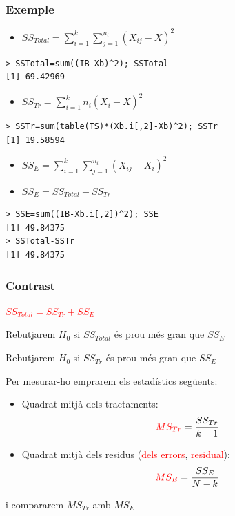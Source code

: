 \documentclass[12pt,t]{beamer}
\newcommand{\red}[1]{\textcolor{red}{#1}}
\renewcommand{\emph}[1]{{\color{red}#1}}
\theoremstyle{plain}
\theoremstyle{definition}
\begin{document}
\begin{frame}[fragile]
\frametitle{Exemple}\vspace*{-3ex}


\begin{itemize}
\item $SS_{Total}=\sum\limits_{i=1}^k\sum\limits_{j=1}^{n_i} (X_{ij}-\overline{X})^2$
\end{itemize}

\begin{lstlisting}
> SSTotal=sum((IB-Xb)^2); SSTotal
[1] 69.42969
\end{lstlisting}\pause

\begin{itemize}
\item $SS_{Tr}=\sum\limits_{i=1}^k n_i
(\overline{X}_{i}-\overline{X})^2$
\end{itemize}

\begin{lstlisting}
> SSTr=sum(table(TS)*(Xb.i[,2]-Xb)^2); SSTr
[1] 19.58594
\end{lstlisting} \pause

\begin{itemize}
\item  $SS_E=\sum\limits_{i=1}^k\sum\limits_{j=1}^{n_i} (X_{ij}-\overline{X}_{i})^2$\pause

\item $SS_E=SS_{Total}-SS_{Tr}$
\end{itemize}

\begin{lstlisting}
> SSE=sum((IB-Xb.i[,2])^2); SSE
[1] 49.84375
> SSTotal-SSTr
[1] 49.84375
\end{lstlisting}
\end{frame}

\begin{frame}
\frametitle{Contrast}

\red{$SS_{Total}=SS_{Tr}+SS_E$}\medskip

Rebutjarem $H_0$ si $SS_{Total}$ és prou més gran que $SS_E$\pause\medskip

Rebutjarem $H_0$ si $SS_{Tr}$ és prou més gran que $SS_E$\pause\medskip

Per mesurar-ho emprarem els estadístics següents:\medskip

\begin{itemize}
\item \emph{Quadrat mitjà dels tractaments}:
$$
\red{MS_{Tr}}=\frac{SS_{Tr}}{k-1}
$$
\item \emph{Quadrat mitjà dels residus} (\red{dels errors}, \red{residual}):
$$
\red{MS_E}=\frac{SS_E}{N-k}
$$
\end{itemize}
i compararem $MS_{Tr}$ amb $MS_E$
\end{frame}
\end{document}
